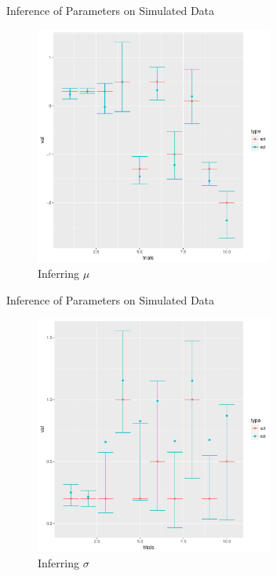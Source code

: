 \documentclass{beamer}
\begin{document}
\begin{frame}{Inference of Parameters on Simulated Data}
  \begin{figure}
    \centering
    \includegraphics[width = 0.7\textwidth]{./mu-100-samples.pdf}
    \caption{Inferring $\mu$}
  \end{figure}
\end{frame}

\begin{frame}{Inference of Parameters on Simulated Data}
  \begin{figure}
    \centering
    \includegraphics[width = 0.7\textwidth]{./sigma-100-samples.pdf}
    \caption{Inferring $\sigma$}
  \end{figure}
\end{frame}
\end{document}
